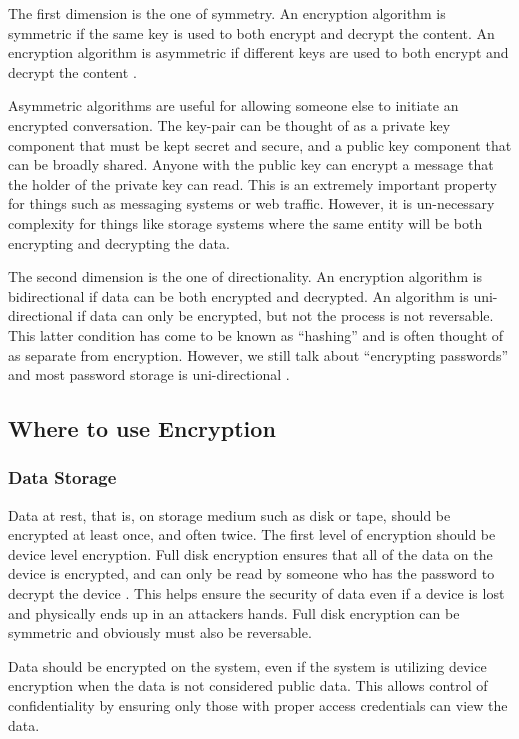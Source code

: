 The first dimension is the one of symmetry. An encryption algorithm is symmetric if the same key is used to both encrypt and decrypt the content.  An encryption algorithm is asymmetric if different keys are used to both encrypt and decrypt the content \parencite{cloudfalreWhatEncryptionTypes}.

Asymmetric algorithms are useful for allowing someone else to initiate an encrypted conversation. The key-pair can be thought of as a private key component that must be kept secret and secure, and a public key component that can be broadly shared. Anyone with the public key can encrypt a message that the holder of the private key can read. This is an extremely important property for things such as messaging systems or web traffic. However, it is un-necessary complexity for things like storage systems where the same entity will be both encrypting and decrypting the data.

The second dimension is the one of directionality. An encryption algorithm is bidirectional if data can be both encrypted and decrypted. An algorithm is uni-directional if data can only be encrypted, but not the process is not reversable. This latter condition has come to be known as ``hashing'' and is often thought of as separate from encryption. However, we still talk about ``encrypting passwords'' and most password storage is uni-directional \parencite{sslstoreDifferenceEncryptionHashing2018}.

\subsection{Where to use Encryption}

\subsubsection{Data Storage}

Data at rest, that is, on storage medium such as disk or tape, should be encrypted at least once, and often twice. The first level of encryption should be device level encryption. Full disk encryption ensures that all of the data on the device is encrypted, and can only be read by someone who has the password to decrypt the device \parencite{mateakiSecuringMobileDevices}. This helps ensure the security of data even if a device is lost and physically ends up in an attackers hands. Full disk encryption can be symmetric and obviously must also be reversable.

Data should be encrypted on the system, even if the system is utilizing device encryption when the data is not considered public data. This allows control of confidentiality by ensuring only those with proper access credentials can view the data.

